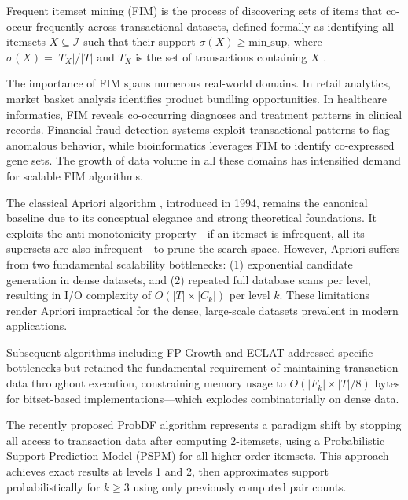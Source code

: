\documentclass[conference]{IEEEtran}
\begin{document}
Frequent itemset mining (FIM) is the process of discovering sets of items
that co-occur frequently across transactional datasets, defined formally
as identifying all itemsets $X \subseteq \mathcal{I}$ such that their
support $\sigma(X) \geq \text{min\_sup}$, where $\sigma(X) = |T_X| /
|T|$ and $T_X$ is the set of transactions containing $X$ \cite{agrawal1994}.

The importance of FIM spans numerous real-world domains. In retail
analytics, market basket analysis identifies product bundling
opportunities. In healthcare informatics, FIM reveals co-occurring
diagnoses and treatment patterns in clinical records. Financial fraud
detection systems exploit transactional patterns to flag anomalous
behavior, while bioinformatics leverages FIM to identify co-expressed
gene sets. The growth of data volume in all these domains has intensified
demand for scalable FIM algorithms.

The classical Apriori algorithm \cite{agrawal1994}, introduced in 1994,
remains the canonical baseline due to its conceptual elegance and strong
theoretical foundations. It exploits the anti-monotonicity property---if
an itemset is infrequent, all its supersets are also infrequent---to
prune the search space. However, Apriori suffers from two fundamental
scalability bottlenecks: (1) exponential candidate generation in dense
datasets, and (2) repeated full database scans per level, resulting in
I/O complexity of $O(|T| \times |C_k|)$ per level $k$. These limitations
render Apriori impractical for the dense, large-scale datasets prevalent
in modern applications.

Subsequent algorithms including FP-Growth \cite{han2000} and ECLAT
\cite{zaki1997} addressed specific bottlenecks but retained the
fundamental requirement of maintaining transaction data throughout
execution, constraining memory usage to $O(|F_k| \times |T|/8)$ bytes
for bitset-based implementations---which explodes combinatorially on
dense data.

The recently proposed ProbDF algorithm \cite{probdf2024} represents a
paradigm shift by stopping all access to transaction data after computing
2-itemsets, using a Probabilistic Support Prediction Model (PSPM) for
all higher-order itemsets. This approach achieves exact results at levels
1 and 2, then approximates support probabilistically for $k \geq 3$
using only previously computed pair counts.
\end{document}
